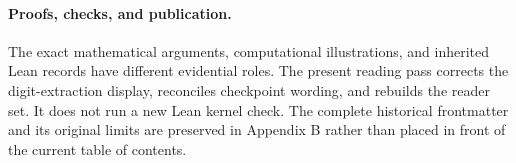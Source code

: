 \paragraph{Proofs, checks, and publication.}
The exact mathematical arguments, computational illustrations, and inherited
Lean records have different evidential roles. The present reading pass corrects
the digit-extraction display, reconciles checkpoint wording, and rebuilds the
reader set. It does not run a new Lean kernel check. The complete historical
frontmatter and its original limits are preserved in Appendix B rather than
placed in front of the current table of contents.
